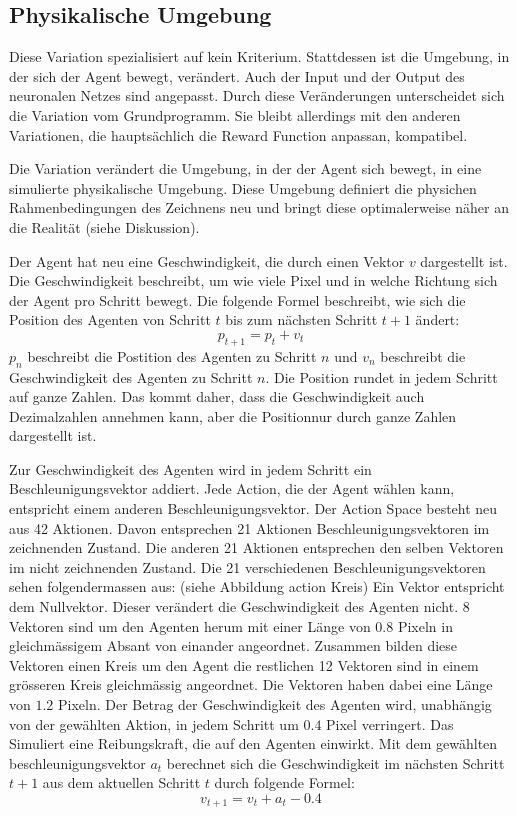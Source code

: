 \subsection{Physikalische Umgebung}
Diese Variation spezialisiert auf kein Kriterium. Stattdessen ist die Umgebung,
in der sich der Agent bewegt, verändert. Auch der Input und der Output des
neuronalen Netzes sind angepasst. Durch diese Veränderungen unterscheidet sich die
Variation vom Grundprogramm. Sie bleibt allerdings mit den anderen
Variationen, die hauptsächlich die Reward Function anpassan, kompatibel.

Die Variation verändert die Umgebung, in der der Agent sich bewegt, in eine
simulierte physikalische Umgebung. Diese Umgebung definiert die physichen
Rahmenbedingungen des Zeichnens neu und bringt diese optimalerweise näher an die
Realität (siehe Diskussion). 

Der Agent hat neu eine Geschwindigkeit, die durch einen Vektor $v$ dargestellt
ist. Die Geschwindigkeit beschreibt, um wie viele Pixel und in welche Richtung
sich der Agent pro Schritt bewegt.
Die folgende Formel beschreibt, wie sich die Position des Agenten von Schritt
$t$ bis zum nächsten Schritt $t+1$ ändert:
$$p_{t+1} = p_t + v_t$$
$p_n$ beschreibt die Postition des Agenten zu Schritt $n$ und $v_n$ beschreibt
die Geschwindigkeit des Agenten zu Schritt $n$. Die Position rundet in jedem
Schritt auf ganze Zahlen. Das kommt daher, dass die Geschwindigkeit auch
Dezimalzahlen annehmen kann, aber die Positionnur durch ganze Zahlen dargestellt
ist.

Zur Geschwindigkeit des Agenten wird in jedem Schritt ein Beschleunigungsvektor
addiert. Jede Action, die der Agent wählen kann, entspricht einem anderen
Beschleunigungsvektor. Der Action Space besteht neu aus 42 Aktionen. Davon
entsprechen 21 Aktionen Beschleunigungsvektoren im zeichnenden Zustand. Die
anderen 21 Aktionen entsprechen den selben Vektoren im nicht zeichnenden
Zustand. Die 21 verschiedenen Beschleunigungsvektoren sehen folgendermassen aus:
(siehe Abbildung action Kreis) Ein Vektor entspricht dem Nullvektor. Dieser
verändert die Geschwindigkeit des Agenten nicht. $8$ Vektoren sind um den
Agenten herum mit einer Länge von $0.8$ Pixeln in gleichmässigem Absant von
einander angeordnet. Zusammen bilden diese Vektoren einen Kreis um den Agent die
restlichen 12 Vektoren sind in einem grösseren Kreis gleichmässig angeordnet.
Die Vektoren haben dabei eine Länge von $1.2$ Pixeln. Der Betrag der
Geschwindigkeit des Agenten wird, unabhängig von der gewählten Aktion, in jedem
Schritt um $0.4$ Pixel verringert. Das Simuliert eine Reibungskraft, die auf den
Agenten einwirkt.
Mit dem gewählten beschleunigungsvektor $a_t$ berechnet sich die Geschwindigkeit
im nächsten Schritt $t+1$ aus dem aktuellen Schritt $t$ durch folgende Formel:
$$v_{t+1} = v_t + a_t - 0.4$$

